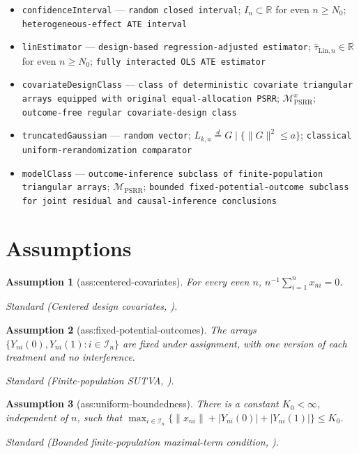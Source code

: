 \documentclass{article}
\newtheorem{assumption}{Assumption}
\begin{document}
\begin{itemize}
  \item \texttt{confidenceInterval} --- \texttt{random closed interval}; \(I_n\subset\mathbb R\) for even \(n\ge N_0\); \texttt{heterogeneous-\allowbreak{}effect ATE interval}
  \item \texttt{linEstimator} --- \texttt{design-\allowbreak{}based regression-\allowbreak{}adjusted estimator}; \(\widehat\tau_{\mathrm{Lin},n}\in\mathbb R\) for even \(n\ge N_0\); \texttt{fully interacted OLS ATE estimator}
  \item \texttt{covariateDesignClass} --- \texttt{class of deterministic covariate triangular arrays equipped with original equal-\allowbreak{}allocation PSRR}; \(\mathcal M_{\mathrm{PSRR}}^{x}\); \texttt{outcome-\allowbreak{}free regular covariate-\allowbreak{}design class}
  \item \texttt{truncatedGaussian} --- \texttt{random vector}; \(L_{k,a}\overset{d}=G\mid\{\|G\|^2\le a\}\); \texttt{classical uniform-\allowbreak{}rerandomization comparator}
  \item \texttt{modelClass} --- \texttt{outcome-\allowbreak{}inference subclass of finite-\allowbreak{}population triangular arrays}; \(\mathcal M_{\mathrm{PSRR}}\); \texttt{bounded fixed-\allowbreak{}potential-\allowbreak{}outcome subclass for joint residual and causal-\allowbreak{}inference conclusions}
\end{itemize}

\section{Assumptions}

\begin{assumption}[ass:centered-covariates]\label{ass:centered-covariates}
For every even \(n\), \(n^{-1}\sum_{i=1}^n x_{ni}=0\).
\par\smallskip\noindent\emph{Standard} (Centered design covariates, \cite{LiDingRubin2018ReM}).
\end{assumption}

\begin{assumption}[ass:fixed-potential-outcomes]\label{ass:fixed-potential-outcomes}
The arrays \(\{Y_{ni}(0),Y_{ni}(1):i\in\mathcal I_n\}\) are fixed under assignment, with one version of each treatment and no interference.
\par\smallskip\noindent\emph{Standard} (Finite-population SUTVA, \cite{ZhuLiu2023PSRR}).
\end{assumption}

\begin{assumption}[ass:uniform-boundedness]\label{ass:uniform-boundedness}
There is a constant \(K_0<\infty\), independent of \(n\), such that \(\max_{i\in\mathcal I_n}\{\|x_{ni}\|+|Y_{ni}(0)|+|Y_{ni}(1)|\}\le K_0\).
\par\smallskip\noindent\emph{Standard} (Bounded finite-population maximal-term condition, \cite{LiDing2017FPCLT}).
\end{assumption}
\end{document}
